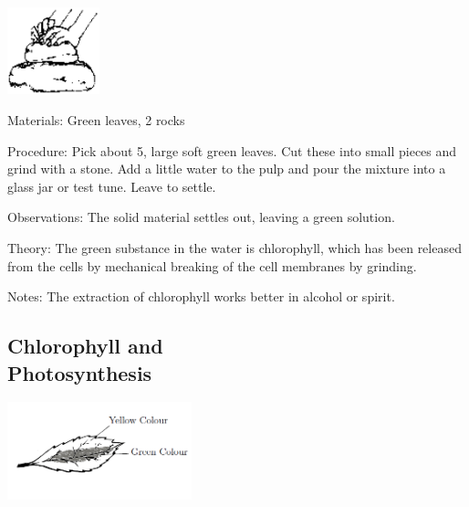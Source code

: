 \begin{multicols}{2}
\begin{center}
\includegraphics[width=0.2\textwidth]{./img/source/chlorophyll-extract.png}
\end{center}

\begin{description*}
\item[Materials:]{Green leaves, 2 rocks}
\item[Procedure:]{Pick about 5, large soft green leaves. Cut these into small pieces and grind with a stone.
Add a little water to the pulp and pour the mixture into a glass jar or test tune. Leave to settle.}
\item[Observations:]{The solid material settles out, leaving a green solution.}
\item[Theory:]{The green substance in the water is chlorophyll, which has been released from the cells by
mechanical breaking of the cell membranes by grinding.}
\item[Notes:]{The extraction of chlorophyll works better in alcohol or spirit.}
\end{description*}

\subsection[Chlorophyll and Photosynthesis]{Chlorophyll and \hfill \\ Photosynthesis} %

\begin{center}
\includegraphics[width=0.4\textwidth]{./img/variegated-leaf.png}
\end{center}


\end{multicols}
